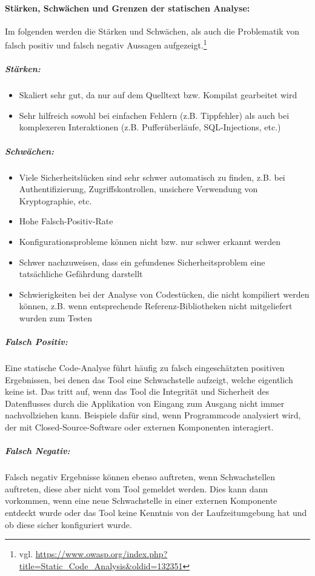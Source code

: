 \paragraph{Stärken, Schwächen und Grenzen der statischen Analyse:}
Im folgenden werden die Stärken und Schwächen, als auch die Problematik von falsch positiv und falsch negativ Aussagen aufgezeigt.\footnote{vgl. \url{https://www.owasp.org/index.php?title=Static_Code_Analysis\&oldid=132351}}
\subparagraph{Stärken:}
\begin{itemize}
\item Skaliert sehr gut, da nur auf dem Quelltext bzw. Kompilat gearbeitet wird
\item Sehr hilfreich sowohl bei einfachen Fehlern (z.B. Tippfehler) als auch bei komplexeren Interaktionen (z.B. Pufferüberläufe, SQL-Injections, etc.)
\end{itemize}

\subparagraph{Schwächen:}
\begin{itemize}
\item Viele Sicherheitslücken sind sehr schwer automatisch zu finden, z.B. bei Authentifizierung, Zugriffskontrollen, unsichere Verwendung von Kryptographie, etc.
\item Hohe Falsch-Positiv-Rate
\item Konfigurationsprobleme können nicht bzw. nur schwer erkannt werden
\item Schwer nachzuweisen, dass ein gefundenes Sicherheitsproblem eine tatsächliche Gefährdung darstellt
\item Schwierigkeiten bei der Analyse von Codestücken, die nicht kompiliert werden können, z.B. wenn entsprechende Referenz-Bibliotheken nicht mitgeliefert wurden zum Testen
\end{itemize}

\subparagraph{Falsch Positiv:}
Eine statische Code-Analyse führt häufig zu falsch eingeschätzten positiven Ergebnissen, bei denen das Tool eine Schwachstelle aufzeigt, welche eigentlich keine ist. Das tritt auf, wenn das Tool die Integrität und Sicherheit des Datenflusses durch die Applikation von Eingang zum Ausgang nicht immer nachvollziehen kann. Beispiele dafür sind, wenn Programmcode analysiert wird, der mit Closed-Source-Software oder externen Komponenten interagiert.

\subparagraph{Falsch Negativ:}
Falsch negativ Ergebnisse können ebenso auftreten, wenn Schwachstellen auftreten, diese aber nicht vom Tool gemeldet werden. Dies kann dann vorkommen, wenn eine neue Schwachstelle in einer externen Komponente entdeckt wurde oder das Tool keine Kenntnis von der Laufzeitumgebung hat und ob diese sicher konfiguriert wurde.

